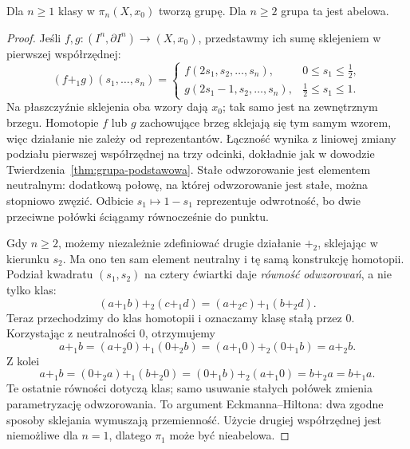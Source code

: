 \begin{twierdzenie}
\label{thm:pi-n-abelowe}
Dla $n\geq1$ klasy w $\pi_n(X,x_0)$ tworzą grupę.
Dla $n\geq2$ grupa ta jest abelowa.
\end{twierdzenie}
\begin{proof}
Jeśli $f,g:(I^n,\partial I^n)\to(X,x_0)$,
przedstawmy ich sumę sklejeniem w pierwszej
współrzędnej:
\[
 (f+_1g)(s_1,\ldots,s_n)=
 \begin{cases}
 f(2s_1,s_2,\ldots,s_n),&0\leq s_1\leq\tfrac12,\\
 g(2s_1-1,s_2,\ldots,s_n),&\tfrac12\leq s_1\leq1.
 \end{cases}
\]
Na płaszczyźnie sklejenia oba wzory dają
$x_0$; tak samo jest na zewnętrznym brzegu.
Homotopie $f$ lub $g$ zachowujące brzeg
sklejają się tym samym wzorem, więc działanie
nie zależy od reprezentantów. Łączność
wynika z liniowej zmiany podziału pierwszej
współrzędnej na trzy odcinki, dokładnie jak
w dowodzie Twierdzenia~\ref{thm:grupa-podstawowa}.
Stałe odwzorowanie jest elementem neutralnym:
dodatkową połowę, na której odwzorowanie jest stałe,
można stopniowo zwęzić. Odbicie
$s_1\mapsto1-s_1$ reprezentuje odwrotność,
bo dwie przeciwne połówki ściągamy
równocześnie do punktu.

Gdy $n\geq2$, możemy niezależnie zdefiniować
drugie działanie $+_2$, sklejając w kierunku
$s_2$. Ma ono ten sam element neutralny
i tę samą konstrukcję homotopii. Podział
kwadratu $(s_1,s_2)$ na cztery ćwiartki
daje \emph{równość odwzorowań}, a nie tylko klas:
\[
 (a+_1 b)+_2(c+_1d)
   =(a+_2c)+_1(b+_2d).
\]
Teraz przechodzimy do klas homotopii i oznaczamy klasę stałą przez $0$.
Korzystając z neutralności $0$, otrzymujemy
\[
 a+_1b=(a+_2 0)+_1(0+_2 b)
      =(a+_1 0)+_2(0+_1 b)=a+_2b.
\]
Z kolei
\[
 a+_1b=(0+_2a)+_1(b+_2 0)
      =(0+_1b)+_2(a+_1 0)=b+_2a=b+_1a.
\]
Te ostatnie równości dotyczą klas; samo usuwanie stałych połówek
zmienia parametryzację odwzorowania.
To argument Eckmanna--Hiltona: dwa
zgodne sposoby sklejania wymuszają
przemienność. Użycie drugiej
współrzędnej jest niemożliwe dla
$n=1$, dlatego $\pi_1$ może być
nieabelowa.
\end{proof}

